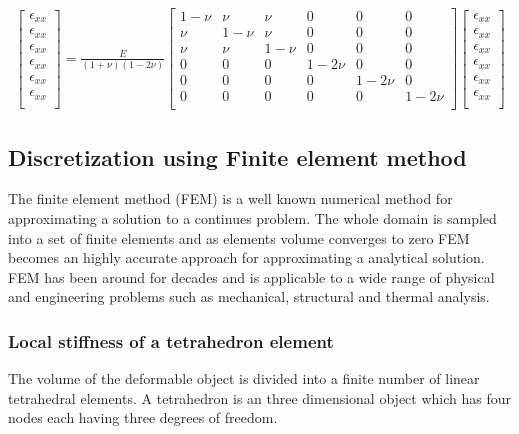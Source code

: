 \documentclass[10pt,a4paper]{article}
\begin{document}
\begin{eqnarray}\label{eqn:ststhooks}
\left[ \begin{array}{c}
\epsilon_{xx} \\
\epsilon_{xx} \\
\epsilon_{xx} \\
\epsilon_{xx} \\
\epsilon_{xx} \\
\epsilon_{xx} \\
\end{array} \right] = \frac{E}{(1+\nu)(1-2\nu)}
\left[ \begin{array}{cccccc}
1-\nu & \nu & \nu & 0 & 0 & 0\\
\nu & 1-\nu & \nu & 0 & 0 & 0\\
\nu & \nu & 1-\nu & 0 & 0 & 0\\
0 & 0 & 0 & 1-2\nu & 0 & 0\\
0 & 0 & 0 & 0 & 1-2\nu & 0\\
0 & 0 & 0 & 0 & 0 & 1-2\nu\\
 \end{array} \right]
\left[ \begin{array}{c}
\epsilon_{xx} \\
\epsilon_{xx} \\
\epsilon_{xx} \\
\epsilon_{xx} \\
\epsilon_{xx} \\
\epsilon_{xx} \\
\end{array} \right]
\end{eqnarray}



\subsection{Discretization using Finite element method}
The finite element method (FEM) is a well known numerical method for approximating a solution to a continues problem. The whole domain is sampled into a set of finite elements and as elements volume converges to zero FEM becomes an highly accurate approach for approximating a analytical solution. FEM has been around for decades and is applicable to a wide range of physical and engineering problems such as mechanical, structural and thermal analysis.

\subsubsection{Local stiffness of a tetrahedron element}\label{sec:localstiffness}
The volume of the deformable object is divided into a finite number of linear tetrahedral elements. A tetrahedron is an three dimensional object which has four nodes each having three degrees of freedom.
\end{document}
